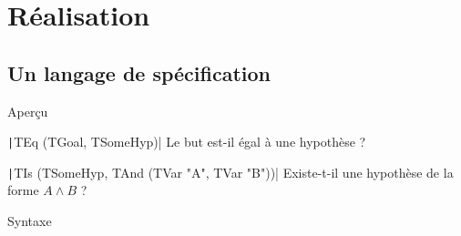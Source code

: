 \documentclass[french,usepdftitle=false,compress]{beamer}
\begin{document}






\section{Réalisation}

\subsection{Un langage de spécification}
\begin{frame}{Aperçu}
  \begin{block}{\texttt|TEq (TGoal, TSomeHyp)|}
    Le but est-il égal à une hypothèse ?
  \end{block}

  \begin{block}{\texttt|TIs (TSomeHyp, TAnd (TVar "A", TVar "B"))|}
    Existe-t-il une hypothèse de la forme $A \land B$ ?
  \end{block}
\end{frame}

\begin{frame}{Syntaxe}
  \inputminted[fontsize=\small]{ocaml}{syntax_var.ml}
  \vfill
  \inputminted[fontsize=\small]{ocaml}{syntax_form.ml}
  \vfill
  \inputminted[fontsize=\small]{ocaml}{syntax.ml}
\end{frame}
\end{document}
